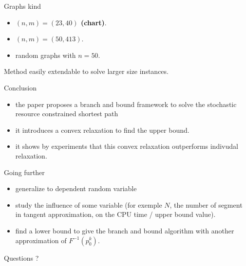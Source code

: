 \documentclass{beamer}
\begin{document}
\begin{frame}
	Graphs kind
	\begin{itemize}
		\item \textbf{$(n,m) = (23,40)$ (chart)}.
		\pause
		\item $(n,m) = (50,413)$.
		\pause
		\item random graphs with $n=50$.
	\end{itemize}
	\pause
	Method easily extendable to solve larger size instances.
\end{frame}

\begin{frame}
	\begin{block}{Conclusion}
		\begin{itemize}
			\pause
			\item the paper proposes a branch and bound framework to solve the stochastic resource constrained shortest path 
			\pause
			\item it introduces a convex relaxation to find the upper bound.
			\pause
			\item it shows by experiments that this convex relaxation outperforms indivudal relaxation.
		\end{itemize}
	\end{block}
	\pause
	\begin{block}{Going further}
		\begin{itemize}
			\item generalize to dependent random variable
			\pause
			\item study the influence of some variable (for exemple $N$, the number of segment in tangent approximation, on the CPU time / upper bound value).
			\pause
			\item find a lower bound to give the branch and bound algorithm with another approximation of $F^{-1}(p_0^{k})$.
		\end{itemize}
	\end{block}
\end{frame}
\begin{frame}
	\begin{center}
	\LARGE{Questions ?}
	\end{center}
\end{frame}
\end{document}
